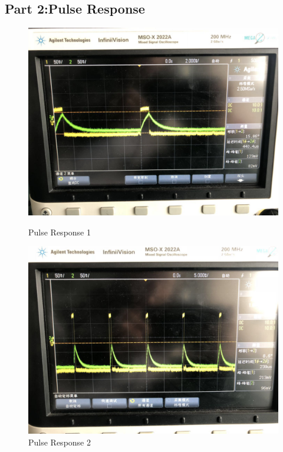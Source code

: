 \documentclass[12pt]{article}
\begin{document}
\subsection{Part 2:Pulse Response}
\begin{figure}[H]
\centering
\includegraphics[scale=0.2]{p3.jpg}
\caption{Pulse Response 1}
\includegraphics[scale=0.2]{p4.jpg}
\caption{Pulse Response 2}
\end{figure}
\end{document}
